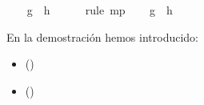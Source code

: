 \begin{isabellebody}
\ \ \isamarkupfalse%
\ {\isachardoublequoteopen}{\isacharquery}g\ {\isacharequal}\ {\isacharquery}h{\isachardoublequoteclose}\ \isamarkupfalse%
\ {}\ {}\ \isamarkupfalse%
\ {\isacharparenleft}rule\ mp{\isacharparenright}\isanewline
\ \ \isamarkupfalse%
\ {\isachardoublequoteopen}{\isacharquery}g\ {\isasymnoteq}\ {\isacharquery}h{\isachardoublequoteclose}\ \isanewline
\ \ \isamarkupfalse%
\ \isanewline
\ \ \ \ \isamarkupfalse%
%
\endisatagproof
{\isafoldproof}%
%
\isadelimproof
%
\endisadelimproof
%
\begin{isamarkuptext}%
En la demostración hemos introducido: 
 \begin{itemize}
    \item[]  
      \hfill () 
  \end{itemize} 
 \begin{itemize}
    \item[]  
      \hfill ()
  \end{itemize} 


\end{isamarkuptext}
\end{isabellebody}
